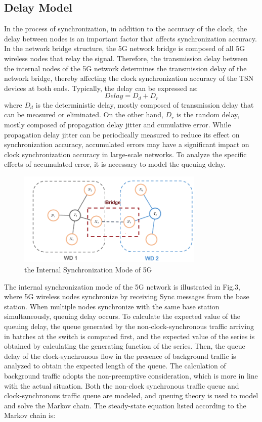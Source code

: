 \documentclass[english]{cccconf}
\begin{document}
\subsection{Delay Model}
In the process of synchronization, in addition to the accuracy of the clock, the delay between nodes is an important factor that affects synchronization accuracy. In the network bridge structure, the 5G network bridge is composed of all 5G wireless nodes that relay the signal. Therefore, the transmission delay between the internal nodes of the 5G network determines the transmission delay of the network bridge, thereby affecting the clock synchronization accuracy of the TSN devices at both ends. Typically, the delay can be expressed as:
\begin{equation}
	Delay=D_d+D_r
\end{equation}
where $D_d$ is the deterministic delay, mostly composed of transmission delay that can be measured or eliminated. On the other hand, $D_r$ is the random delay, mostly composed of propagation delay jitter and cumulative error. While propagation delay jitter can be periodically measured to reduce its effect on synchronization accuracy\cite{9064350}, accumulated errors may have a significant impact on clock synchronization accuracy in large-scale networks. To analyze the specific effects of accumulated error, it is necessary to model the queuing delay.
\begin{figure}[htbp]
	\centering
	\setcounter{figure}{2}
	\includegraphics[width=3.5in]{fig3.png}
	\caption{the Internal Synchronization Mode of 5G }
\end{figure}
The internal synchronization mode of the 5G network is illustrated in Fig.3, where 5G wireless nodes synchronize by receiving Sync messages from the base station. When multiple nodes synchronize with the same base station simultaneously, queuing delay occurs. To calculate the expected value of the queuing delay, the queue generated by the non-clock-synchronous traffic arriving in batches at the switch is computed first, and the expected value of the series is obtained by calculating the generating function of the series. Then, the queue delay of the clock-synchronous flow in the presence of background traffic is analyzed to obtain the expected length of the queue. The calculation of background traffic adopts the non-preemptive consideration, which is more in line with the actual situation. Both the non-clock synchronous traffic queue and clock-synchronous traffic queue are modeled, and queuing theory is used to model and solve the Markov chain. The steady-state equation listed according to the Markov chain is:
\end{document}
